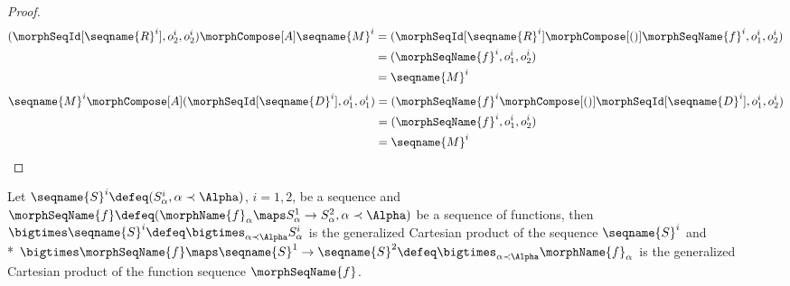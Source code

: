 \documentclass{article}
\begin{document}
\begin{lemma}
\begin{proof}
\begin{equation*}
\begin{split}
  (\morphSeqId[\seqname{R}^i], o^i_2, o^i_2) \morphCompose[A] \seqname{M}^i
  & =
  (\morphSeqId[\seqname{R}^i] \morphCompose[()] \morphSeqName{f}^i, o^i_1, o^i_2)
\\*
  & =
  (\morphSeqName{f}^i, o^i_1, o^i_2)
\\*
  & =
 \seqname{M}^i
\end{split}
\end{equation*}
\begin{equation*}
\begin{split}
  \seqname{M}^i \morphCompose[A] (\morphSeqId[\seqname{D}^i], o^i_1, o^i_1)
  & =
  (\morphSeqName{f}^i \morphCompose[()] \morphSeqId[\seqname{D}^i], o^i_1, o^i_2)
\\*
  & =
  (\morphSeqName{f}^i, o^i_1, o^i_2)
\\*
  & =
 \seqname{M}^i
\end{split}
\end{equation*}
\end{proof}
\end{lemma}

\begin{definition}
\label{def:Cart}
Let $\seqname{S}^i \defeq (S^i_\alpha, \alpha \prec \Alpha)$, $i=1,2$,
be a sequence and
$\morphSeqName{f} \defeq (\morphName{f}_\alpha \maps S^1_\alpha \to
S^2_\alpha, \alpha \prec \Alpha)$
be a sequence of functions, then
$
  \bigtimes \seqname{S}^i \defeq
  \bigtimes_{\alpha \prec \Alpha} S^i_\alpha
$
is the generalized Cartesian product of the sequence $\seqname{S}^i$ and \\*
\donotbreak
  {
    $
      \bigtimes \morphSeqName{f} \maps \seqname{S}^1 \to \seqname{S}^2
      \defeq
      \bigtimes_{\alpha \prec \Alpha}\morphName{f}_\alpha
    $
  }
is the generalized Cartesian product of the function sequence
$\morphSeqName{f}$.
\end{definition}
\end{document}
